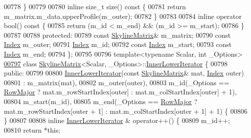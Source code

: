 \begin{DoxyCode}
00778     \}
00779 
00780     \textcolor{keyword}{inline} \textcolor{keywordtype}{size\_t} size()\textcolor{keyword}{ const }\{
00781         \textcolor{keywordflow}{return} m\_matrix.m\_data.upperProfile(m\_outer);
00782     \}
00783 
00784     \textcolor{keyword}{inline} \textcolor{keyword}{operator} bool()\textcolor{keyword}{ const }\{
00785         \textcolor{keywordflow}{return} (m\_id < m\_end) && (m\_id >= m\_start);
00786     \}
00787 
00788 \textcolor{keyword}{protected}:
00789     \textcolor{keyword}{const} \hyperlink{class_eigen_1_1_skyline_matrix}{SkylineMatrix}& m\_matrix;
00790     \textcolor{keyword}{const} \hyperlink{group___core___module_a554f30542cc2316add4b1ea0a492ff02}{Index} m\_outer;
00791     \hyperlink{group___core___module_a554f30542cc2316add4b1ea0a492ff02}{Index} m\_id;
00792     \textcolor{keyword}{const} \hyperlink{group___core___module_a554f30542cc2316add4b1ea0a492ff02}{Index} m\_start;
00793     \textcolor{keyword}{const} \hyperlink{group___core___module_a554f30542cc2316add4b1ea0a492ff02}{Index} m\_end;
00794 \};
00795 
00796 \textcolor{keyword}{template}<\textcolor{keyword}{typename} Scalar, \textcolor{keywordtype}{int} \_Options>
\hyperlink{class_eigen_1_1_skyline_matrix_1_1_inner_lower_iterator}{00797} \textcolor{keyword}{class }\hyperlink{class_eigen_1_1_skyline_matrix}{SkylineMatrix}<Scalar, \_Options>::\hyperlink{class_eigen_1_1_skyline_matrix_1_1_inner_lower_iterator}{InnerLowerIterator} \{
00798 \textcolor{keyword}{public}:
00799 
00800     \hyperlink{class_eigen_1_1_skyline_matrix_1_1_inner_lower_iterator}{InnerLowerIterator}(\textcolor{keyword}{const} \hyperlink{class_eigen_1_1_skyline_matrix}{SkylineMatrix}& mat, 
      \hyperlink{group___core___module_a554f30542cc2316add4b1ea0a492ff02}{Index} outer)
00801     : m\_matrix(mat),
00802     m\_outer(outer),
00803     m\_id(\_Options == \hyperlink{group__enums_ggaacded1a18ae58b0f554751f6cdf9eb13acfcde9cd8677c5f7caf6bd603666aae3}{RowMajor} ? mat.m\_rowStartIndex[outer] : mat.m\_colStartIndex[outer] + 1),
00804     m\_start(m\_id),
00805     m\_end(\_Options == \hyperlink{group__enums_ggaacded1a18ae58b0f554751f6cdf9eb13acfcde9cd8677c5f7caf6bd603666aae3}{RowMajor} ? mat.m\_rowStartIndex[outer + 1] : mat.m\_colStartIndex[outer + 1] + 
      1) \{
00806     \}
00807 
00808     \textcolor{keyword}{inline} \hyperlink{class_eigen_1_1_skyline_matrix_1_1_inner_lower_iterator}{InnerLowerIterator} & operator++() \{
00809         m\_id++;
00810         \textcolor{keywordflow}{return} *\textcolor{keyword}{this};

\end{DoxyCode}
